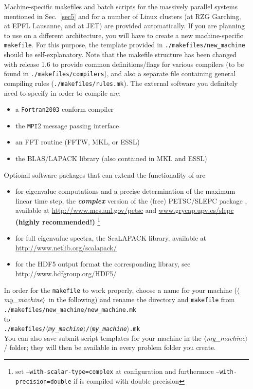 \documentclass[12pt]{article}
\newcommand{\mach}{$\langle$\textsl{my\_machine}$\rangle$}
\begin{document}
Machine-specific makefiles and batch scripts for the massively parallel systems mentioned in Sec.~\ref{sec5} and for a
number of Linux clusters (at RZG Garching, at EPFL Lausanne, and at JET) are provided automatically. If
you are planning to use \gene on a different architecture, you will have to create a new machine-specific
{\tt makefile}. For this purpose, the template provided in \texttt{./makefiles/new\_machine} should
be self-explanatory. Note that the makefile structure has been changed with release 1.6 to provide common 
definitions/flags for various compilers (to be found in \texttt{./makefiles/compilers}), and also a separate
file containing general compiling rules (\texttt{./makefiles/rules.mk}). 
The external software you definitely need to specify in order to compile \gene are:
\begin{itemize}
\item a {\tt Fortran2003} conform compiler 
\item the {\tt MPI}2 message passing interface
\item an FFT routine (FFTW, MKL, or ESSL)
\item the BLAS/LAPACK library (also contained in MKL and ESSL)
\end{itemize}
Optional software packages that can extend the functionality of \gene are 
\begin{itemize}
\item for eigenvalue computations and a precise determination of the maximum linear time step,
the {\bf \emph{complex}} version of the (free) PETSC/SLEPC package 
\cite{petsc1,petsc2,slepc}, available at \url{http://www.mcs.anl.gov/petsc} 
and \url{www.grycap.upv.es/slepc} {\bf (highly recommended!)}
\footnote{set {\tt --with-scalar-type=complex} at configuration and furthermore {\tt --with-precision=double} if \gene is compiled with double precision}
\item for full eigenvalue spectra, the ScaLAPACK library, available at \url{http://www.netlib.org/scalapack/}
\item for the HDF5 output format the corresponding library, see \url{http://www.hdfgroup.org/HDF5/}
\end{itemize}
In order for the {\tt makefile} to work properly, choose a name for
your machine (\mach\ in the following) and rename the directory and {\tt makefile} from\\
\texttt{./makefiles/new\_machine/new\_machine.mk}\\ to\\ \texttt{./makefiles/\mach/\mach.mk}\\
You can also save submit script templates for your machine in the \mach/ folder; they will then be
available in every problem folder you create.
\end{document}
